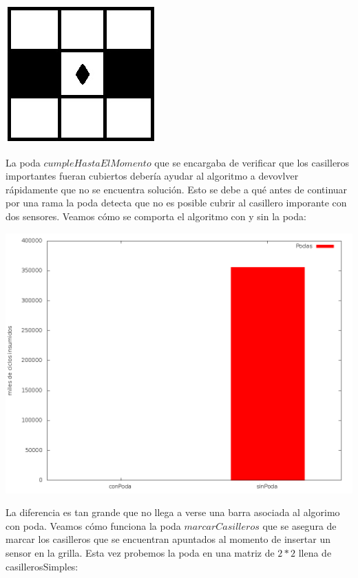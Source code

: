 \includegraphics[scale=0.5]{ej3/imgs/ejSinSolucion.png}

La poda $cumpleHastaElMomento$ que se encargaba de verificar que los casilleros importantes fueran cubiertos debería ayudar al algoritmo a devovlver rápidamente que no se encuentra solución. Esto se debe a qué antes de continuar por una rama la poda detecta que no es posible cubrir al casillero imporante con dos sensores. Veamos cómo se comporta el algoritmo con y sin la poda:

\includegraphics[scale=0.3]{ej3/imgs/cumpleHastaElMomento.png}

La diferencia es tan grande que no llega a verse una barra asociada al algorimo con poda. Veamos cómo funciona la poda $marcarCasilleros$ que se asegura de marcar los casilleros que se encuentran apuntados al momento de insertar un sensor en la grilla. Esta vez probemos la poda en una matriz de $2*2$ llena de casillerosSimples:

